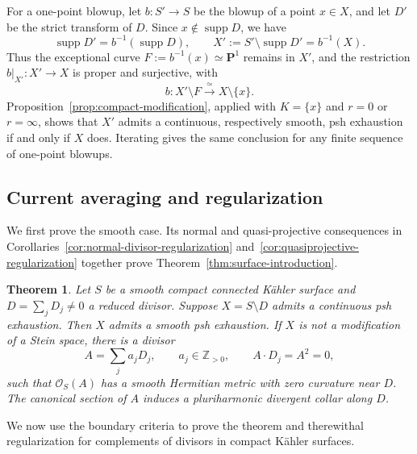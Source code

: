 \documentclass[11pt]{amsart}
\newtheorem{theorem}{Theorem}[section]
\theoremstyle{definition}
\theoremstyle{remark}
\numberwithin{equation}{section}
\newcommand{\PP}{\mathbf P}
\newcommand{\OO}{\mathcal O}
\newcommand{\supp}{\operatorname{supp}}
\begin{document}
For a one-point blowup, let $b:S'\to S$ be the blowup of
a point $x\in X$, and let $D'$ be the strict transform
of $D$. Since $x\notin\supp D$, we have
\[
  \supp D'=b^{-1}(\supp D),
  \qquad
  X':=S'\setminus\supp D'=b^{-1}(X).
\]
Thus the exceptional curve $F:=b^{-1}(x)\simeq\PP^1$
remains in $X'$, and the restriction $b|_{X'}:X'\to X$
is proper and surjective, with
\[
  b:X'\setminus F\xrightarrow{\ \simeq\ }X\setminus\{x\}.
\]
Proposition~\ref{prop:compact-modification}, applied with
$K=\{x\}$ and $r=0$ or $r=\infty$, shows that $X'$
admits a continuous, respectively smooth, psh exhaustion
if and only if $X$ does. Iterating gives the same conclusion
for any finite sequence of one-point blowups.

\subsection{Current averaging and regularization}
\label{subsec:divisor-regularization}

We first prove the smooth case. Its normal and quasi-projective
consequences in Corollaries~\ref{cor:normal-divisor-regularization}
and~\ref{cor:quasiprojective-regularization} together prove
Theorem~\ref{thm:surface-introduction}.

\begin{theorem}\label{thm:divisor-regularization}
Let $S$ be a smooth compact connected K\"ahler surface and
$D=\sum_jD_j\ne0$ a reduced divisor.
Suppose $X=S\setminus D$ admits a continuous psh exhaustion.
Then $X$ admits a smooth psh exhaustion.
If $X$ is not a modification of a Stein space, there is a divisor
\[
 A=\sum_j a_jD_j,\qquad a_j\in\mathbb Z_{>0},\qquad
 A\cdot D_j=A^2=0,
\]
such that $\OO_S(A)$ has a smooth Hermitian metric with zero
curvature near $D$. The canonical section of $A$ induces a
pluriharmonic divergent collar along $D$.
\end{theorem}

We now use the boundary criteria to prove the theorem and therewithal regularization for complements of divisors in compact Kähler surfaces.
\end{document}
